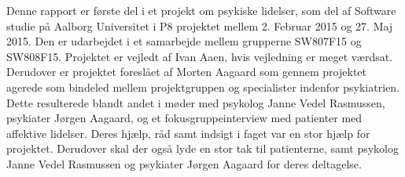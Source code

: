 Denne rapport er første del i et projekt om psykiske lidelser, som del af Software studie på Aalborg Universitet i P8 projektet mellem 2. Februar 2015 og 27. Maj 2015. 
Den er udarbejdet i et samarbejde mellem grupperne SW807F15 og SW808F15.
Projektet er vejledt af Ivan Aaen, hvis vejledning er meget værdsat.
Derudover er projektet foreslået af Morten Aagaard som gennem projektet agerede som bindeled mellem projektgruppen og specialister indenfor psykiatrien. Dette resulterede blandt andet i møder med psykolog Janne Vedel Rasmussen, psykiater Jørgen Aagaard, og et fokusgruppeinterview med patienter med affektive lidelser. Deres hjælp, råd samt indsigt i faget var en stor hjælp for projektet.
Derudover skal der også lyde en stor tak til patienterne, samt psykolog Janne Vedel Rasmussen og psykiater Jørgen Aagaard for deres deltagelse.